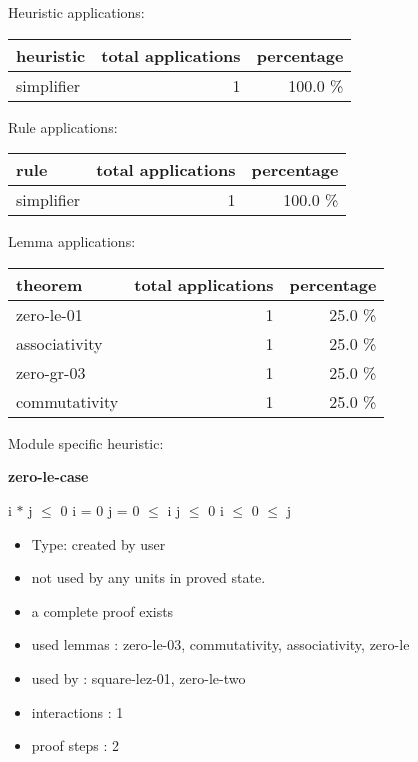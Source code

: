 \documentclass[a4paper]{article}
\begin{document}
\medskip


Heuristic applications:

\begin{supertabular}{l|r|r}
heuristic	& total applications & percentage \\ \hline
simplifier & 1 & 100.0 \% \\

\end{supertabular}

Rule applications:

\begin{supertabular}{l|r|r}
rule	        & total applications & percentage \\ \hline
simplifier & 1 & 100.0 \% \\

\end{supertabular}

Lemma applications:

\begin{supertabular}{l|r|r}
theorem	        & total applications & percentage \\ \hline
zero-le-01 & 1 & 25.0 \% \\
associativity & 1 & 25.0 \% \\
zero-gr-03 & 1 & 25.0 \% \\
commutativity & 1 & 25.0 \% \\

\end{supertabular}

Module specific heuristic:

\pagebreak

{\LARGE\bf zero-le-case}\label{lemma-zero-le-case}

\medskip

 \Fol i $*$ j $\le$ 0 \Equiv i = 0 \Or j = 0  $\le$ i \And j $\le$ 0 \Or i $\le$ 0  $\le$ j

\begin{itemize}

\item Type: created by user

\item not used by any units in proved state.
\item       a complete proof exists
\item       used lemmas  : zero-le-03, commutativity, associativity, zero-le
\item       used by      : square-lez-01, zero-le-two
\item       interactions : 1
\item       proof steps  : 2
\end{itemize}
\end{document}
